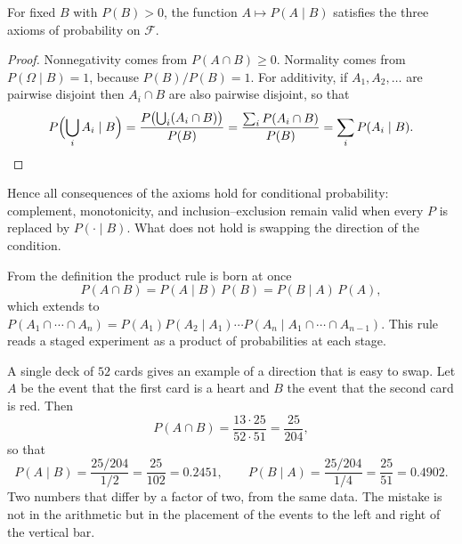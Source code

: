 \begin{proposisi}
For fixed $B$ with $P(B)>0$, the function $A\mapsto P(A\mid B)$ satisfies the three axioms
of probability on $\mathcal{F}$.
\end{proposisi}

\begin{proof}
Nonnegativity comes from $P(A\cap B)\ge 0$. Normality comes from $P(\Omega\mid B)=1$,
because $P(B)/P(B)=1$. For additivity, if $A_{1},A_{2},\dots$ are pairwise disjoint then
$A_{i}\cap B$ are also pairwise disjoint, so that
\[
P\Bigl(\bigcup_{i}A_{i}\mid B\Bigr)
=\frac{P\bigl(\bigcup_{i}(A_{i}\cap B)\bigr)}{P(B)}
=\frac{\sum_{i}P(A_{i}\cap B)}{P(B)}
=\sum_{i}P(A_{i}\mid B).\qedhere
\]
\end{proof}

Hence all consequences of the axioms hold for conditional probability: complement,
monotonicity, and inclusion--exclusion remain valid when every $P$ is replaced by
$P(\cdot\mid B)$. What does not hold is swapping the direction of the condition.

From the definition the product rule is born at once
\[
P(A\cap B)=P(A\mid B)\,P(B)=P(B\mid A)\,P(A),
\]
which extends to
$P(A_{1}\cap\cdots\cap A_{n})=P(A_{1})P(A_{2}\mid A_{1})\cdots
P(A_{n}\mid A_{1}\cap\cdots\cap A_{n-1})$. This rule reads a staged experiment as a
product of probabilities at each stage.

A single deck of $52$ cards gives an example of a direction that is easy to swap. Let $A$
be the event that the first card is a heart and $B$ the event that the second card is red.
Then
\[
P(A\cap B)=\frac{13\cdot 25}{52\cdot 51}=\frac{25}{204},
\]
so that
\[
P(A\mid B)=\frac{25/204}{1/2}=\frac{25}{102}=0.2451,
\qquad
P(B\mid A)=\frac{25/204}{1/4}=\frac{25}{51}=0.4902 .
\]
Two numbers that differ by a factor of two, from the same data. The mistake is not in the
arithmetic but in the placement of the events to the left and right of the vertical bar.

